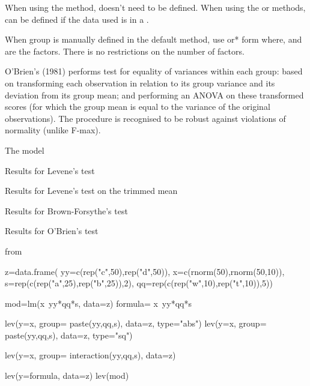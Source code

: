 \documentclass[a4paper]{book}
\begin{document}
%
\begin{Details}\relax
When using the  method,  doesn't need to be defined. When using the
 or  methods,  can be defined if the data used
is in a .

When group is manually defined in the default method, use  or\bsl{}*
form where,  and 
are the factors. There is no restrictions on the number of factors.

O'Brien's (1981) performs test for equality of variances within each group:
based on transforming each observation in relation to its group variance
and its deviation from its group mean; and performing an ANOVA on these
transformed scores (for which the group mean is equal to the variance of the
original observations). The procedure is recognised to be robust against
violations of normality (unlike F-max).


\end{Details}
%
\begin{Value}

\begin{ldescription}
\item[\code{Model}] The model
\item[\code{Levene}] Results for Levene's test
\item[\code{LeveneTrimMean}] Results for Levene's test on the trimmed mean
\item[\code{Brown.Forsythe}] Results for Brown-Forsythe's test
\item[\code{OBrien}] Results for O'Brien's test

\end{ldescription}
\end{Value}
%
\begin{SeeAlso}\relax
{} from 
\end{SeeAlso}
%
\begin{Examples}
\begin{ExampleCode}
z=data.frame( yy=c(rep("c",50),rep("d",50)),
              x=c(rnorm(50),rnorm(50,10)),
              s=rep(c(rep("a",25),rep("b",25)),2),
              qq=rep(c(rep("w",10),rep("t",10)),5))

mod=lm(x~yy*qq*s, data=z)
formula= x~yy*qq*s

lev(y=x, group= paste(yy,qq,s), data=z, type="abs")
lev(y=x, group= paste(yy,qq,s), data=z, type="sq")

lev(y=x, group= interaction(yy,qq,s), data=z)

lev(y=formula, data=z)
lev(mod)

\end{ExampleCode}
\end{Examples}
\end{document}
